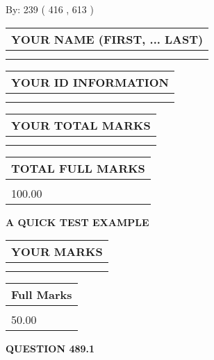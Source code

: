 \documentclass[12pt]{article}
\begin{document}
   
\hspace{1.0in} By: 
 239 ( 416 ,  613 )
   
   
   
   
\newpage 
\setcounter{page}{ 
   489001 } 
   
   
   
   
\noindent\begin{tabular}{|l|}
\hline
YOUR NAME (FIRST, ... LAST)  \\
\hline
 \\ 
 \\ 
\hline
\end{tabular}
\hspace{0.05in} \begin{tabular}{|l|}
\hline
 YOUR   ID   INFORMATION  \\
\hline
 \\ 
 \\ 
\hline
\end{tabular}
   
   
\vspace{0.2in}\noindent\begin{tabular}{|l|}
\hline
YOUR TOTAL MARKS  \\
\hline
 \\ 
 \\ 
\hline
\end{tabular}
\hspace{0.05in} \begin{tabular}{|l|}
\hline
TOTAL FULL MARKS  \\
\hline
 \\ 
100.00 \\
\hline
\end{tabular}
   
   
 \vspace{0.2in}
{\LARGE {\textbf{ A QUICK TEST EXAMPLE}}}
   
   
  
\vspace{0.2in}
  
\noindent\begin{tabular}{|l|}
\hline
 YOUR MARKS  \\
\hline
 \\ 
 \\ 
\hline
\end{tabular}
\hspace{0.05in} \begin{tabular}{|l|}
\hline
 Full Marks  \\
\hline
 \\ 
50.00 \\
\hline
\end{tabular}
{\textbf{\Large{QUESTION
489.1 
}}}
  
\end{document}
